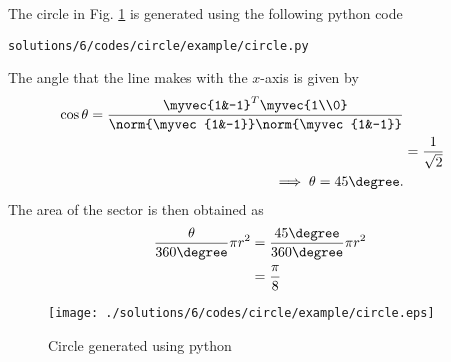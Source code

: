 %
The circle in Fig. \ref{fig:4.1.6_cir_1} is generated using the following python code 
\begin{lstlisting}
solutions/6/codes/circle/example/circle.py
\end{lstlisting}


The angle that the line makes with the $x$-axis is given by 
\begin{align}
\cos \theta = \frac{\myvec{1&-1}^T\myvec{1\\0}}{\norm{\myvec{1&-1}}\norm{\myvec{1&-1}}}
\\
&=\frac{1}{\sqrt{2}}
\\
\implies \theta = 45 \degree.
\end{align}
The area of the sector is then obtained as
\begin{align}
\frac{\theta}{360 \degree}\pi r^2 &= \frac{45 \degree}{360 \degree}\pi r^2 
\\
&= \frac{\pi}{8}
\end{align}
\begin{figure}[!ht]
\centering
\texttt{[image: ./solutions/6/codes/circle/example/circle.eps]}
\caption{Circle generated using python}
\label{fig:4.1.6_cir_1}
\end{figure}
